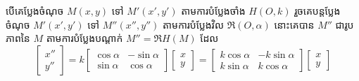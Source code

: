 \begin{formulaBox}[ជាទូទៅ]
បើគេប្លែងចំណុច $M(x, y)$ ទៅ $M'(x', y')$ តាមការបំប្លែងចាំង $H(O, k)$ រួចគេបន្តប្លែងចំណុច $M'(x', y')$ ទៅ $M''(x'', y'')$ តាមការបំប្លែងវិល $\mathfrak{R}(O, \alpha)$ នោះគេបាន $M''$ ជារូបភាពនៃ $M$ តាមការបំប្លែងបណ្ដាក់ $M'' = \mathfrak{R}H(M)$ ដែល
\[ \begin{bmatrix} x''\\ y'' \end{bmatrix} = k\begin{bmatrix} \cos\alpha & -\sin\alpha\\ \sin\alpha & \cos\alpha \end{bmatrix}\begin{bmatrix} x\\ y \end{bmatrix} = \begin{bmatrix} k\cos\alpha & -k\sin\alpha\\ k\sin\alpha & k\cos\alpha \end{bmatrix}\begin{bmatrix} x\\ y \end{bmatrix} \]
\end{formulaBox}

